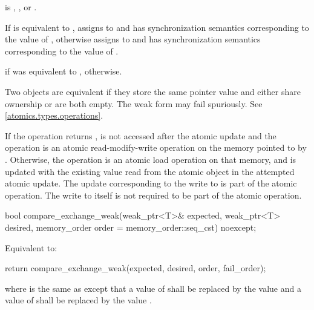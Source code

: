 \begin{itemdescr}
\pnum
\expects
{} is
,
, or
.

\pnum
\effects
If  is equivalent to ,
assigns  to  and
has synchronization semantics corresponding to the value of ,
otherwise assigns  to  and
has synchronization semantics corresponding to the value of .

\pnum
\returns
{} if  was equivalent to ,
 otherwise.

\pnum
\remarks
Two  objects are equivalent if
they store the same pointer value and
either share ownership or are both empty.
The weak form may fail spuriously. See \ref{atomics.types.operations}.

\pnum
If the operation returns ,
 is not accessed after the atomic update and
the operation is an atomic read-modify-write operation
on the memory pointed to by .
Otherwise, the operation is an atomic load operation on that memory, and
 is updated with the existing value
read from the atomic object in the attempted atomic update.
The  update corresponding to the write to 
is part of the atomic operation.
The write to  itself
is not required to be part of the atomic operation.
\end{itemdescr}

%
\begin{itemdecl}
bool compare_exchange_weak(weak_ptr<T>& expected, weak_ptr<T> desired,
                           memory_order order = memory_order::seq_cst) noexcept;
\end{itemdecl}

\begin{itemdescr}
\pnum
\effects
Equivalent to:
\begin{codeblock}
return compare_exchange_weak(expected, desired, order, fail_order);
\end{codeblock}
where  is the same as 
except that a value of 
shall be replaced by the value  and
a value of 
shall be replaced by the value .
\end{itemdescr}

